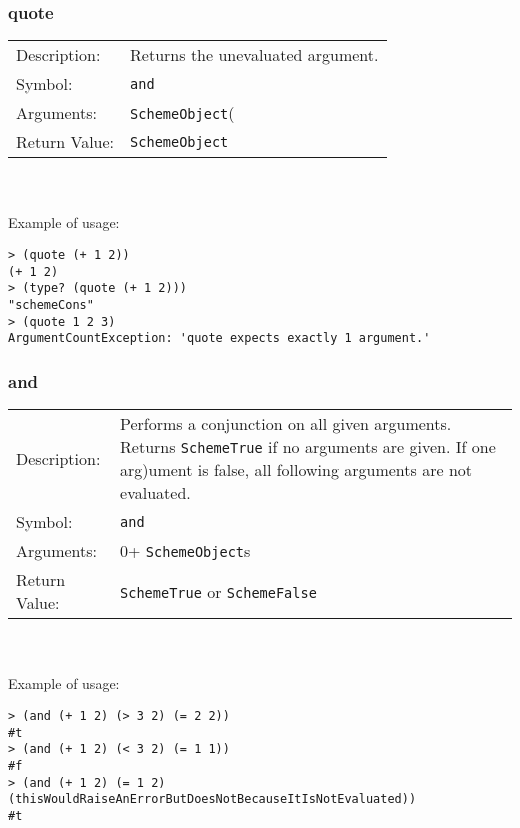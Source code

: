 \documentclass[12pt,a4paper]{scrartcl}
\begin{document}
\subsubsection*{quote}
\begin{tabular}{l  p{13cm}}
Description: & Returns the unevaluated argument.\\
Symbol: & \lstinline{and}\\
Arguments: & \lstinline{SchemeObject}( \\
Return Value: & \lstinline{SchemeObject}\\
\end{tabular}
\\
\\
Example of usage:
\begin{lstlisting}
> (quote (+ 1 2))
(+ 1 2)
> (type? (quote (+ 1 2)))
"schemeCons"
> (quote 1 2 3)
ArgumentCountException: 'quote expects exactly 1 argument.' 
\end{lstlisting}

\subsubsection*{and}
\begin{tabular}{l  p{13cm}}
Description: & Performs a conjunction on all given arguments. Returns \lstinline{SchemeTrue} if no arguments are given. If one arg)ument is false, all following arguments are not evaluated. \\
Symbol: & \lstinline{and}\\
Arguments: & 0+ \lstinline{SchemeObject}s \\
Return Value: & \lstinline{SchemeTrue} or \lstinline{SchemeFalse}\\
\end{tabular}
\\
\\
Example of usage:
\begin{lstlisting}
> (and (+ 1 2) (> 3 2) (= 2 2))
#t
> (and (+ 1 2) (< 3 2) (= 1 1))
#f
> (and (+ 1 2) (= 1 2) (thisWouldRaiseAnErrorButDoesNotBecauseItIsNotEvaluated))
#t
\end{lstlisting}
\end{document}
